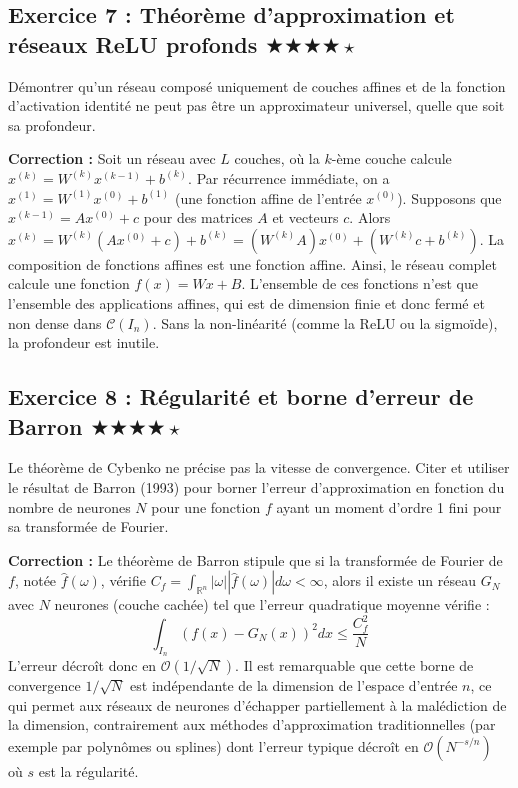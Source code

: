 \documentclass[11pt,a4paper]{article}
\begin{document}
\subsection*{Exercice 7 : Théorème d'approximation et réseaux ReLU profonds \quad $\bigstar\bigstar\bigstar\bigstar\star$}

Démontrer qu'un réseau composé uniquement de couches affines et de la fonction d'activation identité ne peut pas être un approximateur universel, quelle que soit sa profondeur.

\textbf{Correction :}
Soit un réseau avec $L$ couches, où la $k$-ème couche calcule $x^{(k)} = W^{(k)} x^{(k-1)} + b^{(k)}$.
Par récurrence immédiate, on a $x^{(1)} = W^{(1)} x^{(0)} + b^{(1)}$ (une fonction affine de l'entrée $x^{(0)}$).
Supposons que $x^{(k-1)} = A x^{(0)} + c$ pour des matrices $A$ et vecteurs $c$.
Alors $x^{(k)} = W^{(k)} (A x^{(0)} + c) + b^{(k)} = (W^{(k)} A) x^{(0)} + (W^{(k)} c + b^{(k)})$.
La composition de fonctions affines est une fonction affine.
Ainsi, le réseau complet calcule une fonction $f(x) = W x + B$.
L'ensemble de ces fonctions n'est que l'ensemble des applications affines, qui est de dimension finie et donc fermé et non dense dans $\mathcal{C}(I_n)$. Sans la non-linéarité (comme la ReLU ou la sigmoïde), la profondeur est inutile.


\vspace{1cm}
\subsection*{Exercice 8 : Régularité et borne d'erreur de Barron \quad $\bigstar\bigstar\bigstar\bigstar\star$}

Le théorème de Cybenko ne précise pas la vitesse de convergence. Citer et utiliser le résultat de Barron (1993) pour borner l'erreur d'approximation en fonction du nombre de neurones $N$ pour une fonction $f$ ayant un moment d'ordre 1 fini pour sa transformée de Fourier.

\textbf{Correction :}
Le théorème de Barron stipule que si la transformée de Fourier de $f$, notée $\hat{f}(\omega)$, vérifie $C_f = \int_{\mathbb{R}^n} |\omega| |\hat{f}(\omega)| d\omega < \infty$, alors il existe un réseau $G_N$ avec $N$ neurones (couche cachée) tel que l'erreur quadratique moyenne vérifie :
$$\int_{I_n} (f(x) - G_N(x))^2 dx \le \frac{C_f^2}{N}$$
L'erreur décroît donc en $\mathcal{O}(1/\sqrt{N})$.
Il est remarquable que cette borne de convergence $1/\sqrt{N}$ est indépendante de la dimension de l'espace d'entrée $n$, ce qui permet aux réseaux de neurones d'échapper partiellement à la malédiction de la dimension, contrairement aux méthodes d'approximation traditionnelles (par exemple par polynômes ou splines) dont l'erreur typique décroît en $\mathcal{O}(N^{-s/n})$ où $s$ est la régularité.
\end{document}
